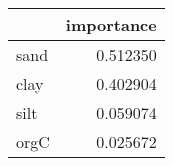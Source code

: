 \begin{tabular}{lr}
\toprule
 & importance \\
\midrule
sand & 0.512350 \\
clay & 0.402904 \\
silt & 0.059074 \\
orgC & 0.025672 \\
\bottomrule
\end{tabular}
